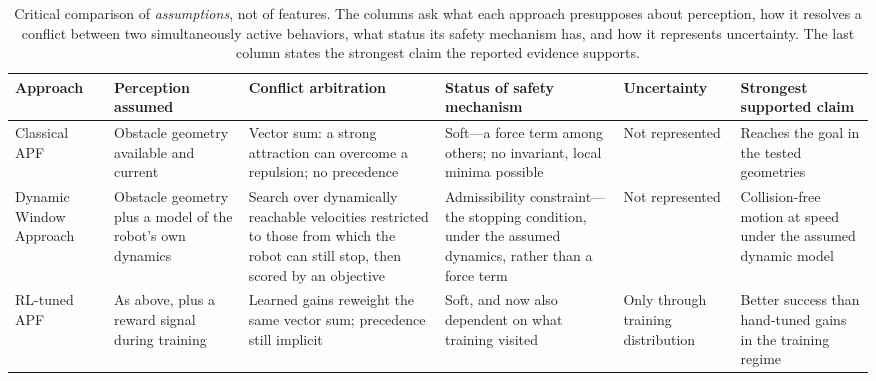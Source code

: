 \begin{table}[!t]
\caption{Critical comparison of \emph{assumptions}, not of features. The columns ask
what each approach presupposes about perception, how it resolves a conflict between
two simultaneously active behaviors, what status its safety mechanism has, and how it
represents uncertainty. The last column states the strongest claim the reported
evidence supports.}
\label{tab:comparison}
\centering
\footnotesize
\setlength{\tabcolsep}{3pt}
\begin{tabular}{p{2.0cm}p{2.9cm}p{3.0cm}p{2.8cm}p{2.4cm}p{2.6cm}}
\hline
\textbf{Approach} & \textbf{Perception assumed} & \textbf{Conflict arbitration} &
\textbf{Status of safety mechanism} & \textbf{Uncertainty} &
\textbf{Strongest supported claim} \\
\hline
Classical APF~\cite{khatib1986} &
Obstacle geometry available and current &
Vector sum: a strong attraction can overcome a repulsion; no precedence &
Soft---a force term among others; no invariant, local minima possible &
Not represented &
Reaches the goal in the tested geometries \\

Dynamic Window Approach~\cite{fox1997} &
Obstacle geometry plus a model of the robot's own dynamics &
Search over dynamically reachable velocities restricted to those from which the
robot can still stop, then scored by an objective &
Admissibility constraint---the stopping condition, under the assumed dynamics,
rather than a force term &
Not represented &
Collision-free motion at speed under the assumed dynamic model \\

RL-tuned APF~\cite{zhang2023apf} &
As above, plus a reward signal during training &
Learned gains reweight the same vector sum; precedence still implicit &
Soft, and now also dependent on what training visited &
Only through training distribution &
Better success than hand-tuned gains in the training regime \\


\end{tabular}
\end{table}
